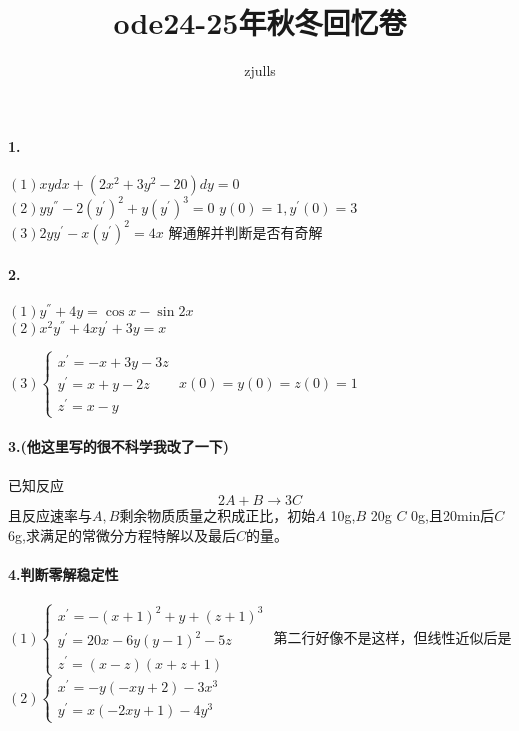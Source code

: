 \documentclass{article}
\begin{document}
	\title{ode24-25年秋冬回忆卷}
	\author{zjulls}
	\maketitle
    \paragraph{1.}
    $
    (1) xydx + (2x^2+3y^2-20)dy = 0
    $
    \\

    $
    (2) yy^{''}-2(y^{'})^{2}+y(y^{'})^3 = 0
    $
    $y(0)=1,y^{'}(0)=3$
    \\

    $
    (3) 2yy^{'} - x(y^{'})^{2} = 4x
    $
    解通解并判断是否有奇解
    \paragraph{2.}
    $
    (1)y^{''}+4y = \cos x - \sin 2x 
    $
    \\

    $
    (2) x^2y^{''}+4xy^{'}+3y = x
    $

    $
    (3)
    \begin{cases} 
        x^{'} = -x+3y-3z \\
        y^{'} = x+y-2z \\
        z^{'} = x-y  
    \end{cases}
    $
    $x(0)=y(0)=z(0)=1$
    \paragraph{3.(他这里写的很不科学我改了一下)}
    已知反应\[
    2A+B\rightarrow 3C
    \]
    且反应速率与$A,B$剩余物质质量之积成正比，初始$A$ 10g,$B$ 20g $C $ 0g,且20min后$C$ 6g,求满足的常微分方程特解以及最后$C$的量。
    \paragraph{4.判断零解稳定性}
    $
    (1)
    \begin{cases} 
        x^{'} = -(x+1)^{2} + y +(z+1)^{3} \\
        y^{'} = 20x-6y(y-1)^{2}-5z\\
        z^{'} = (x-z)(x+z+1)  
    \end{cases}
    $ 
    第二行好像不是这样，但线性近似后是
    \\

    $
    (2)
    \begin{cases} 
        x^{'} = -y(-xy+2)-3x^{3} \\
        y^{'} = x(-2xy+1)-4y^{3}
    \end{cases}
    $ 
\end{document}
